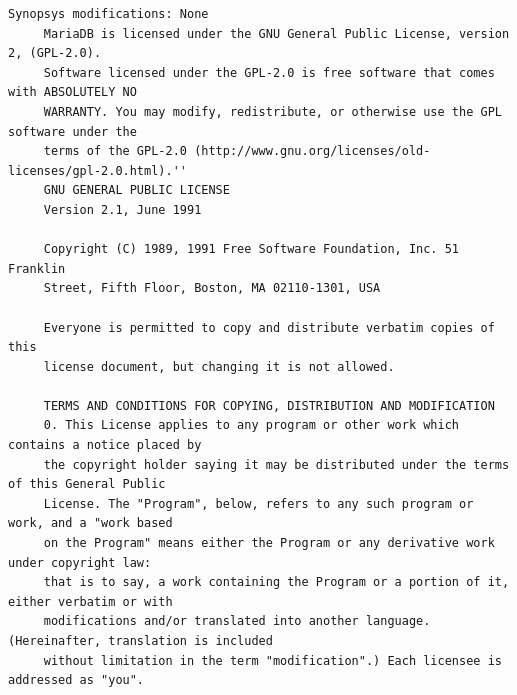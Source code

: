 \begin{lstlisting}[basicstyle=\ttfamily\footnotesize,breaklines=true]
     Synopsys modifications: None
     MariaDB is licensed under the GNU General Public License, version 2, (GPL-2.0).
     Software licensed under the GPL-2.0 is free software that comes with ABSOLUTELY NO
     WARRANTY. You may modify, redistribute, or otherwise use the GPL software under the
     terms of the GPL-2.0 (http://www.gnu.org/licenses/old-licenses/gpl-2.0.html).''
     GNU GENERAL PUBLIC LICENSE
     Version 2.1, June 1991

     Copyright (C) 1989, 1991 Free Software Foundation, Inc. 51 Franklin
     Street, Fifth Floor, Boston, MA 02110-1301, USA

     Everyone is permitted to copy and distribute verbatim copies of this
     license document, but changing it is not allowed.

     TERMS AND CONDITIONS FOR COPYING, DISTRIBUTION AND MODIFICATION
     0. This License applies to any program or other work which contains a notice placed by
     the copyright holder saying it may be distributed under the terms of this General Public
     License. The "Program", below, refers to any such program or work, and a "work based
     on the Program" means either the Program or any derivative work under copyright law:
     that is to say, a work containing the Program or a portion of it, either verbatim or with
     modifications and/or translated into another language. (Hereinafter, translation is included
     without limitation in the term "modification".) Each licensee is addressed as "you".





\end{lstlisting}
